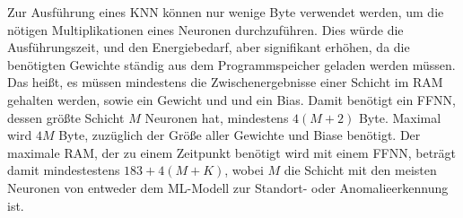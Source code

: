 \newline
\newline
Zur Ausführung eines KNN können nur wenige Byte verwendet werden, um die nötigen Multiplikationen eines Neuronen durchzuführen.
Dies würde die Ausführungszeit, und den Energiebedarf, aber signifikant erhöhen, da die benötigten Gewichte ständig aus dem Programmspeicher geladen werden müssen.
Das heißt, es müssen mindestens die Zwischenergebnisse einer Schicht im RAM gehalten werden, sowie ein Gewicht und und ein Bias.
Damit benötigt ein FFNN, dessen größte Schicht $M$ Neuronen hat, mindestens $4(M+2)$ Byte.
Maximal wird $4M$ Byte, zuzüglich der Größe aller Gewichte und Biase benötigt.
Der maximale RAM, der zu einem Zeitpunkt benötigt wird mit einem FFNN, beträgt damit mindestestens $183 + 4(M + K)$,
wobei $M$ die Schicht mit den meisten Neuronen von entweder dem ML-Modell zur Standort- oder Anomalieerkennung ist.

